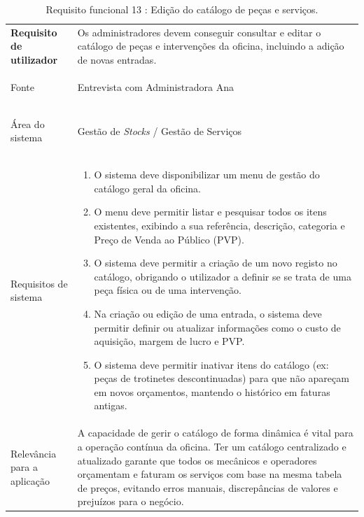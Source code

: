 \documentclass[a4paper,12pt]{scrreprt}
\begin{document}
\begin{table}[H]
    \centering
    \renewcommand{\arraystretch}{1.5} 
    
    \begin{tabular}{|>{\columncolor{gray!15}\bfseries}p{4cm}|p{10.5cm}|}
        \hline
        Requisito de utilizador & Os administradores devem conseguir consultar e editar o catálogo de peças e intervenções da oficina, incluindo a adição de novas entradas. \\ \hdashline
        
        Fonte & Entrevista com Administradora Ana \\ \hdashline
        
        Área do sistema & Gestão de \textit{Stocks} / Gestão de Serviços \\ \hdashline
        
        Requisitos de sistema & 
        \begin{enumerate}[leftmargin=*, nosep, topsep=2pt, partopsep=0pt]
            \item O sistema deve disponibilizar um menu de gestão do catálogo geral da oficina.
            \item O menu deve permitir listar e pesquisar todos os itens existentes, exibindo a sua referência, descrição, categoria e Preço de Venda ao Público (PVP).
            \item O sistema deve permitir a criação de um novo registo no catálogo, obrigando o utilizador a definir se se trata de uma peça física ou de uma intervenção.
            \item Na criação ou edição de uma entrada, o sistema deve permitir definir ou atualizar informações como o custo de aquisição, margem de lucro e PVP.
            \item O sistema deve permitir inativar itens do catálogo (ex: peças de trotinetes descontinuadas) para que não apareçam em novos orçamentos, mantendo o histórico em faturas antigas.
        \end{enumerate} \\ \hdashline
        
        Relevância para a aplicação & A capacidade de gerir o catálogo de forma dinâmica é vital para a operação contínua da oficina. Ter um catálogo centralizado e atualizado garante que todos os mecânicos e operadores orçamentam e faturam os serviços com base na mesma tabela de preços, evitando erros manuais, discrepâncias de valores e prejuízos para o negócio.\\ \hline
    \end{tabular}
    \caption{Requisito funcional 13 : Edição do catálogo de peças e serviços.}
    \label{tab:rf_edicao_catalogo}
\end{table}
\end{document}

